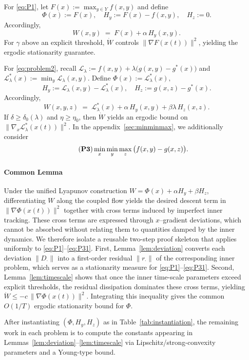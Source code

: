 \documentclass{article}
\newcommand{\1}{\mathbf{1}}
\begin{document}
For \ref{eq:P1},
let $F(x):=\max_{y\in Y}f(x,y)$ and define
\[
\Phi(x):=F(x),\quad
H_y:=F(x)-f(x,y),\quad
H_z:= 0.
\]
Accordingly,
\[
W(x,y)\;=\;F(x)+\alpha\,H_y(x,y).
\]
For $\gamma$ above an explicit threshold, $\dot W$ controls $\|\nabla F(x(t))\|^2$, yielding the ergodic stationarity guarantee.


For \ref{eq:problem2},
recall $\mathcal L_\lambda:=f(x,y)+\lambda\bigl(g(x,y)-g^*(x)\bigr)$ and $\mathcal L_\lambda^*(x):=\min_y\mathcal L_\lambda(x,y)$.
Define $\Phi(x):=\mathcal L_\lambda^*(x),$
\[
H_y:=\mathcal L_\lambda(x,y)-\mathcal L_\lambda^*(x), \quad
H_z:=g(x,z)-g^*(x).
\]
Accordingly,
\[
W(x,y,z)\;=\;\mathcal L_\lambda^*(x)+\alpha\,H_y(x,y)+\beta\lambda\,H_z(x,z).
\]
If $\delta\ge\delta_0(\lambda)$ and $\eta\ge\eta_0$, then $\dot W$ yields an ergodic bound on $\|\nabla_x\mathcal L_\lambda^*(x(t))\|^2$. 
In the appendix~\ref{sec:minminmax}, we additionally consider 
\begin{equation}\label{eq:P31}
\tag{\textbf{P3}}
\min_x\min_y\max_z\,\bigl(f(x,y)-g(x,z)\bigr).
\end{equation}



\paragraph{Common Lemma}
Under the unified Lyapunov construction $W=\Phi(x)+\alpha H_y+\beta H_z$, differentiating $W$
along the coupled flow yields the desired descent term in $\|\nabla \Phi(x(t))\|^2$ together with cross terms induced by imperfect inner tracking. 
These cross terms are expressed through $x$--gradient deviations, which cannot be absorbed without relating them to quantities damped by the inner dynamics. We therefore isolate a reusable two-step proof skeleton that applies uniformly to \ref{eq:P1}--\ref{eq:P31}. First, Lemma~\ref{lem:deviation} converts each deviation $\|D_\cdot\|$ into a first-order residual
$\|r_\cdot\|$ of the corresponding inner problem, which serves as a stationarity measure for \ref{eq:P1}--\ref{eq:P31}.
Second, Lemma~\ref{lem:timescale} shows that once the inner time-scale parameters exceed explicit thresholds,
the residual dissipation dominates these cross terms, yielding $\dot W\le -c\,\|\nabla\Phi(x(t))\|^2$.
Integrating this inequality gives the common $O(1/T)$ ergodic stationarity bound for $\Phi$.

After instantiating $(\Phi,H_y,H_z)$ as in Table~\ref{tab:instantiation}, the remaining work in each problem
is to compute the constants appearing in Lemmas~\ref{lem:deviation}--\ref{lem:timescale} via
Lipschitz/strong-convexity parameters and a Young-type bound. 
\end{document}

